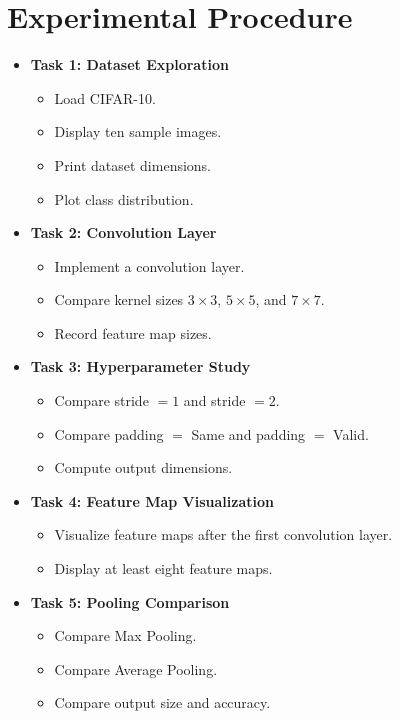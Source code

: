 \documentclass[11pt]{article}
\begin{document}
\section{Experimental Procedure}
\begin{itemize}
    \item \textbf{Task 1: Dataset Exploration}
    \begin{itemize}
        \item Load CIFAR-10.
        \item Display ten sample images.
        \item Print dataset dimensions.
        \item Plot class distribution.
    \end{itemize}

    \item \textbf{Task 2: Convolution Layer}
    \begin{itemize}
        \item Implement a convolution layer.
        \item Compare kernel sizes $3 \times 3$, $5 \times 5$, and $7 \times 7$.
        \item Record feature map sizes.
    \end{itemize}

    \item \textbf{Task 3: Hyperparameter Study}
    \begin{itemize}
        \item Compare stride $= 1$ and stride $= 2$.
        \item Compare padding $=$ Same and padding $=$ Valid.
        \item Compute output dimensions.
    \end{itemize}

    \item \textbf{Task 4: Feature Map Visualization}
    \begin{itemize}
        \item Visualize feature maps after the first convolution layer.
        \item Display at least eight feature maps.
    \end{itemize}

    \item \textbf{Task 5: Pooling Comparison}
    \begin{itemize}
        \item Compare Max Pooling.
        \item Compare Average Pooling.
        \item Compare output size and accuracy.
    \end{itemize}


\end{itemize}
\end{document}
